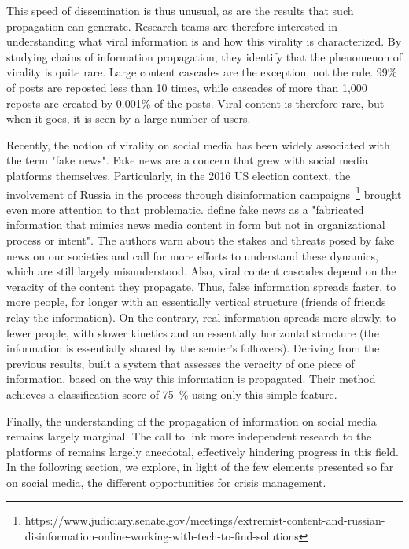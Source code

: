 This speed of dissemination is thus unusual, as are the results that such propagation can generate.
Research teams are therefore interested in understanding what viral information is and how this virality is characterized.
By studying chains of information propagation, they identify that the phenomenon of virality is quite rare.
Large content cascades are the exception, not the rule.
99\% of posts are reposted less than 10 times, while cascades of more than 1,000 reposts are created by 0.001\% of the posts.
Viral content is therefore rare, but when it goes, it is seen by a large number of users.

Recently, the notion of virality on social media has been widely associated with the term "fake news".
Fake news are a concern that grew with social media platforms themselves.
Particularly, in the 2016 US election context, the involvement of Russia in the process through disinformation campaigns~\footnote{https://www.judiciary.senate.gov/meetings/extremist-content-and-russian-disinformation-online-working-with-tech-to-find-solutions}
brought even more attention to that problematic.
\textcite{lazerScienceFakeNews2018} define fake news as a "fabricated information that mimics news media content in form but not in organizational process or intent".
The authors warn about the stakes and threats posed by fake news on our societies and call for more efforts to understand these dynamics, which are still largely misunderstood.
Also, viral content cascades depend on the veracity of the content they propagate.
Thus, false information spreads faster, to more people, for longer with an essentially vertical structure (friends of friends relay the information).
On the contrary, real information spreads more slowly, to fewer people, with slower kinetics and an essentially horizontal structure (the information is essentially shared by the sender's followers).
Deriving from the previous results, \textcite{vosoughiRumorGaugePredicting2017} built a system that assesses the veracity of one piece of information, based on the way this information is propagated.
Their method achieves a classification score of 75~\% using only this simple feature.

Finally, the understanding of the propagation of information on social media remains largely marginal.
The call to link more independent research to the platforms of \textcite{lazerScienceFakeNews2018} remains largely anecdotal, effectively hindering progress in this field.
In the following section, we explore, in light of the few elements presented so far on social media, the different opportunities for crisis management.

